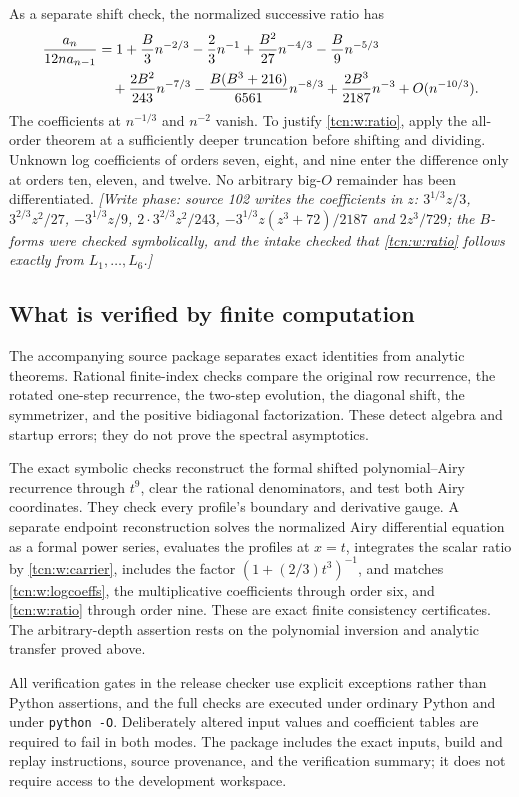 \documentclass[11pt,letterpaper]{article}
\theoremstyle{remark}
\begin{document}
As a separate shift check, the normalized successive ratio has
\begin{align}
 \frac{a_n}{12n a_{n-1}}
 &=1+\frac B3n^{-2/3}-\frac23n^{-1}
      +\frac{B^2}{27}n^{-4/3}
      -\frac{B}{9}n^{-5/3}\notag\\
 &\quad+\frac{2B^2}{243}n^{-7/3}
      -\frac{B(B^3+216)}{6561}n^{-8/3}
      +\frac{2B^3}{2187}n^{-3}+O(n^{-10/3}).\label{tcn:w:ratio}
\end{align}
The coefficients at $n^{-1/3}$ and $n^{-2}$ vanish. To justify \eqref{tcn:w:ratio}, apply the all-order theorem at a sufficiently deeper truncation before shifting and dividing. Unknown log coefficients of orders seven, eight, and nine enter the difference only at orders ten, eleven, and twelve. No arbitrary big-$O$ remainder has been differentiated. \emph{[Write phase: source 102 writes the coefficients in $z$: $3^{1/3}z/3$, $3^{2/3}z^2/27$, $-3^{1/3}z/9$, $2\cdot3^{2/3}z^2/243$, $-3^{1/3}z(z^3+72)/2187$ and $2z^3/729$; the $B$-forms were checked symbolically, and the intake checked that \eqref{tcn:w:ratio} follows exactly from $L_1,\ldots,L_6$.]}

\subsection{What is verified by finite computation}
The accompanying source package separates exact identities from analytic theorems. Rational finite-index checks compare the original row recurrence, the rotated one-step recurrence, the two-step evolution, the diagonal shift, the symmetrizer, and the positive bidiagonal factorization. These detect algebra and startup errors; they do not prove the spectral asymptotics.

The exact symbolic checks reconstruct the formal shifted polynomial--Airy recurrence through $t^9$, clear the rational denominators, and test both Airy coordinates. They check every profile's boundary and derivative gauge. A separate endpoint reconstruction solves the normalized Airy differential equation as a formal power series, evaluates the profiles at $x=t$, integrates the scalar ratio by \eqref{tcn:w:carrier}, includes the factor $(1+(2/3)t^3)^{-1}$, and matches \eqref{tcn:w:logcoeffs}, the multiplicative coefficients through order six, and \eqref{tcn:w:ratio} through order nine. These are exact finite consistency certificates. The arbitrary-depth assertion rests on the polynomial inversion and analytic transfer proved above.

All verification gates in the release checker use explicit exceptions rather than Python assertions, and the full checks are executed under ordinary Python and under \texttt{python -O}. Deliberately altered input values and coefficient tables are required to fail in both modes. The package includes the exact inputs, build and replay instructions, source provenance, and the verification summary; it does not require access to the development workspace.
\end{document}
